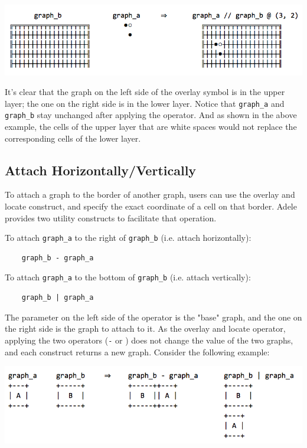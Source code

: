 \documentclass[11pt,letterpaper]{article}
\begin{document}
\includegraphics[width=\textwidth]{./graph_01.png}

It's clear that the graph on the left side of the overlay symbol is in the upper layer; the one on the right side is in the lower layer. Notice that \texttt{graph\_a} and \texttt{graph\_b} stay unchanged after applying the operator. And as shown in the above example, the cells of the upper layer that are white spaces would not replace the corresponding cells of the lower layer.

\subsection {Attach Horizontally/Vertically}

To attach a graph to the border of another graph, users can use the overlay and locate construct, and specify the exact coordinate of a cell on that border. Adele provides two utility constructs to facilitate that operation.

To attach \texttt{graph\_a} to the right of \texttt{graph\_b} (i.e. attach horizontally):
\begin{lstlisting}
    graph_b - graph_a
\end{lstlisting}

To attach \texttt{graph\_a} to the bottom of \texttt{graph\_b} (i.e. attach vertically):
\begin{lstlisting}
    graph_b | graph_a
\end{lstlisting}

The parameter on the left side of the operator is the "base" graph, and the one on the right side is the graph to attach to it. As the overlay and locate operator, applying the two operators (\texttt{-} or \texttt{\textbar}) does not change the value of the two graphs, and each construct returns a new graph. Consider the following example:

\includegraphics[width=\textwidth]{./graph_02.png}
\end{document}
